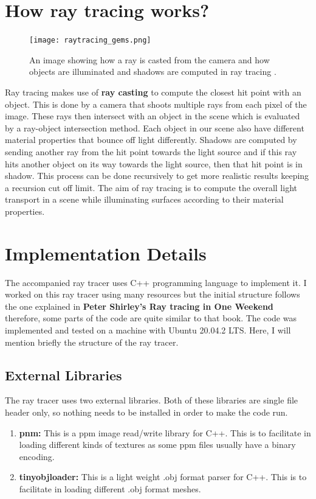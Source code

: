 \documentclass[11pt,a4paper]{article}
\begin{document}
	\section{How ray tracing works?}
	\begin{figure}[H]
		\centering
		\texttt{[image: raytracing\_gems.png]}
		\caption{\centering An image showing how a ray is casted from the camera and how objects are illuminated and shadows are computed in ray tracing \protect\cite{haines2019ray}.}
	\end{figure}
	Ray tracing makes use of \textbf{ray casting} to compute the closest hit point with an object. This is done by a camera that shoots multiple rays from each pixel of the image. These rays then intersect with an object in the scene which is evaluated by a ray-object intersection method. Each object in our scene also have different material properties that bounce off light differently. Shadows are computed by sending another ray from the hit point towards the light source and if this ray hits another object on its way towards the light source, then that hit point is in shadow. This process can be done recursively to get more realistic results keeping a recursion cut off limit. The aim of ray tracing is to compute the overall light transport in a scene while illuminating surfaces according to their material properties.
	
	\section{Implementation Details}
	The accompanied ray tracer uses C++ programming language to implement it. I worked on this ray tracer using many resources but the initial structure follows the one explained in \textbf{Peter Shirley's Ray tracing in One Weekend} \cite{Shirley2020RTW1} therefore, some parts of the code are quite similar to that book. The code was implemented and tested on a machine with Ubuntu 20.04.2 LTS. Here, I will mention briefly the structure of the ray tracer.
	\subsection{External Libraries}
	The ray tracer uses two external libraries. Both of these libraries are single file header only, so nothing needs to be installed in order to make the code run.
	\begin{enumerate}
		\item \textbf{pnm:} This is a ppm image read/write library for C++. This is to facilitate in loading different kinds of textures as some ppm files usually have a binary encoding.
		\item \textbf{tinyobjloader:} This is a light weight .obj format parser for C++. This is to facilitate in loading different .obj format meshes.
	\end{enumerate}
\end{document}
